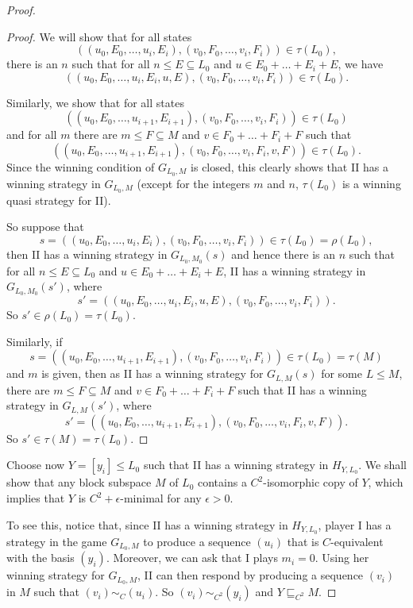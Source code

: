 \documentclass[10pt]{amsart}
\numberwithin{equation}{section}
\begin{document}
\begin{proof}
\begin{proof}
We will show that for all states
$$
((u_0,E_0, \ldots,u_i,E_i),(v_0,F_0,\ldots,v_i,F_i))\in \tau(L_0),
 $$
 there is an $n$ such that for all $n{\ensuremath{\leqslant}} E\subseteq L_0$ and $u\in E_0+\ldots+E_i+E$, we have
 $$
 ((u_0,E_0, \ldots,u_i,E_i,u,E),(v_0,F_0,\ldots,v_i,F_i))\in \tau(L_0).
 $$

Similarly, we show that  for all states
$$
((u_0,E_0, \ldots,u_{i+1},E_{i+1}),(v_0,F_0,\ldots,v_i,F_i))\in \tau(L_0)
$$
and for all $m$ there are $m{\ensuremath{\leqslant}} F\subseteq M$ and $v\in F_0+\ldots+F_i+F$ such that
$$
((u_0,E_0, \ldots,u_{i+1},E_{i+1}),(v_0,F_0,\ldots,v_i,F_i,v,F))\in \tau(L_0).
$$
Since the winning condition of $G_{L_0,M}$ is closed, this clearly shows that
II has a winning strategy in $G_{L_0,M}$ (except for the integers $m$ and $n$,
$\tau(L_0)$ is a winning quasi strategy for II).

So suppose that
$$
s=((u_0,E_0, \ldots,u_i,E_i),(v_0,F_0,\ldots,v_i,F_i))\in \tau(L_0)=\rho(L_0),
$$
then II has a winning strategy in $G_{L_0,M_0}(s)$ and hence there is an $n$
such that for all $n{\ensuremath{\leqslant}} E\subseteq L_0$ and $u\in E_0+\ldots+E_i+E$, II has a
winning strategy in $G_{L_0,M_0}(s')$, where
$$
s'= ((u_0,E_0, \ldots,u_i,E_i,u,E),(v_0,F_0,\ldots,v_i,F_i)).
$$
So $s'\in \rho(L_0)=\tau(L_0)$.

Similarly, if
$$
s=((u_0,E_0, \ldots,u_{i+1},E_{i+1}),(v_0,F_0,\ldots,v_i,F_i))\in \tau(L_0)=\tau(M)
$$
and $m$ is given, then as II has a winning  strategy for $G_{L,M}(s)$ for some
$L{\ensuremath{\leqslant}} M$, there are  $m{\ensuremath{\leqslant}} F\subseteq M$ and $v\in F_0+\ldots+F_i+F$ such
that II has a winning strategy in $G_{L,M}(s')$, where
$$
s'=((u_0,E_0, \ldots,u_{i+1},E_{i+1}),(v_0,F_0,\ldots,v_i,F_i,v,F)).
$$
So $s'\in \tau(M)=\tau(L_0)$.
\end{proof}
Choose now $Y=[y_i]{\ensuremath{\leqslant}} L_0$ such that II has a winning strategy in
$H_{Y,L_0}$. We shall show that any block subspace $M$ of $L_0$ contains a
$C^2$-isomorphic copy of $Y$, which implies that $Y$ is $C^2+\epsilon$-minimal
for any $\epsilon>0$.

To see this, notice that, since II has a winning strategy in $H_{Y,L_0}$,
player I has a strategy in the game $G_{L_0,M}$ to produce a sequence $(u_i)$
that is $C$-equivalent with the basis $(y_i)$. Moreover, we can ask that I
plays $m_i=0$. Using her winning strategy for $G_{L_0,M}$, II can then respond
by producing a sequence $(v_i)$ in $M$ such that $(v_i)\sim_C(u_i)$. So
$(v_i)\sim_{C^2}(y_i)$ and $Y\sqsubseteq_{C^2} M$.
\end{proof}
\end{document}
